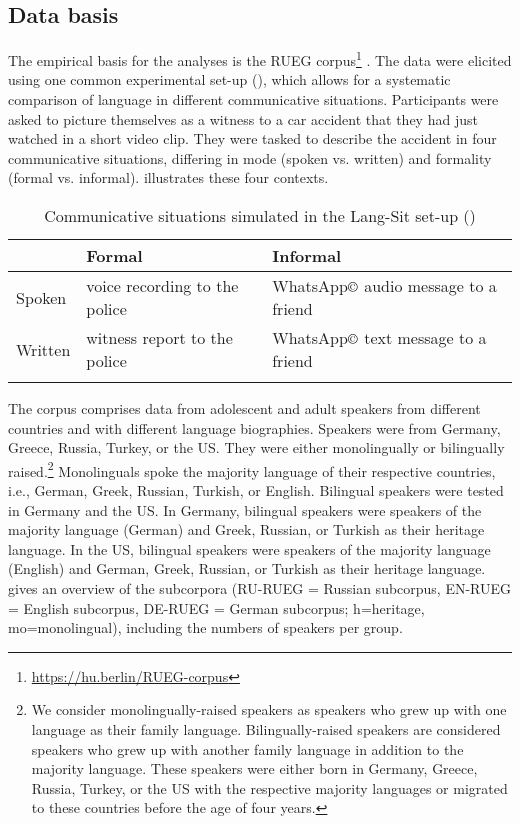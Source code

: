 \documentclass[output=paper,colorlinks,citecolor=brown]{langscibook}
\begin{document}
\subsection{Data basis}

The empirical basis for the analyses is the RUEG corpus\footnote{\url{https://hu.berlin/RUEG-corpus}} \parencite{RUEGcorpus2024}. The data were elicited using one common experimental set-up (\cite{wiese_language_2020}), which allows for a systematic comparison of language in different communicative situations. Participants were asked to picture themselves as a witness to a car accident that they had just watched in a short video clip. They were tasked to describe the accident in four communicative situations, differing in mode (spoken vs. written) and formality (formal vs. informal).  illustrates these four contexts. 

\begin{table} [h!]
\label{tab:bunk:Lang-Sit_set-up}
  \begin{tabularx}{\textwidth}{llQ}
    \lsptoprule
    & Formal & Informal \\
    \midrule
    Spoken & voice recording to the police & WhatsApp$\copyright$ audio message to a friend \\
    Written & witness report to the police & WhatsApp$\copyright$ text message to a friend \\
    \lspbottomrule
  \end{tabularx}
  \caption{Communicative situations simulated in the Lang-Sit set-up (\cite{wiese_language_2020})}
  \label{bunk:ComSit-Wiese2020}
\end{table}

The corpus comprises data from adolescent and adult speakers from different countries and with different language biographies. Speakers were from Germany, Greece, Russia, Turkey, or the US. They were either monolingually or bilingually raised.\footnote{We consider monolingually-raised speakers as speakers who grew up with one language as their family language. Bilingually-raised speakers are considered speakers who grew up with another family language in addition to the majority language. These speakers were either born in Germany, Greece, Russia, Turkey, or the US with the respective majority languages or migrated to these countries before the age of four years.} Monolinguals spoke the majority language of their respective countries, i.e., German, Greek, Russian, Turkish, or English. Bilingual speakers were tested in Germany and the US. In Germany, bilingual speakers were speakers of the majority language (German) and Greek, Russian, or Turkish as their heritage language. In the US, bilingual speakers were speakers of the majority language (English) and German, Greek, Russian, or Turkish as their heritage language.  gives an overview of the subcorpora (RU-RUEG = Russian subcorpus, EN-RUEG = English subcorpus, DE-RUEG = German subcorpus; h=heritage, mo=monolingual), including the numbers of speakers per group.
\end{document}
